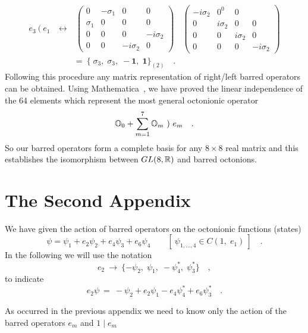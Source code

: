 \documentclass[a4paper,12pt]{book}
\begin{document}
\[
\begin{array}{llll}
{e_{3}~(~e_{1}}~ & \leftrightarrow & ~\left( 
\begin{array}{cccc}
0 & -\sigma _{1} & 0 & 0 \\ 
\sigma _{1} & 0 & 0 & 0 \\ 
0 & 0 & 0 & -i\sigma _{2} \\ 
0 & 0 & -i\sigma _{2} & 0
\end{array}
\right) & \left( 
\begin{array}{cccc}
-i\sigma _{2} & 0^{0} & 0 &  \\ 
0 & i\sigma _{2} & 0 & 0 \\ 
0 & 0 & i\sigma _{2} & 0 \\ 
0 & 0 & 0 & -i\sigma _{2}
\end{array}
\right) \\ 
&  & =~\{\;\sigma _{3},\;\sigma _{3},\;-\mathbf{1},\;\mathbf{1}\}_{(2)}\quad
. & 
\end{array}
\]
Following this procedure any matrix representation of right/left barred
operators can be obtained. Using Mathematica~\cite{math}, we have proved the
linear independence of the 64 elements which represent the most general
octonionic operator 
\[
\Bbb{O}_{0}+\sum_{m=1}^{7}\Bbb{O}_{m}~)~e_{m}\quad . 
\]
So our barred operators form a complete basis for any $8\times 8$ real
matrix and this establishes the isomorphism between $GL(8,\Bbb{R})$ and
barred octonions.

\newpage

\chapter{The Second Appendix}


We have given the action of barred operators on the octonionic functions
(states) 
\[
\psi =\psi _{1}+e_{2}\psi _{2}+e_{4}\psi _{3}+e_{6}\psi _{4}\quad \quad
[~\psi _{1,...,4}\in C(1,\;e_{1})~]\quad . 
\]
In the following we will use the notation 
\[
e_{2}~\rightarrow ~\{-\psi _{2},\;\psi _{1},\;-\psi _{4}^{*},\;\psi
_{3}^{*}\}\quad , 
\]
to indicate 
\[
e_{2}\psi ~=~-\psi _{2}+e_{2}\psi _{1}-e_{4}\psi _{4}^{*}+e_{6}\psi
_{3}^{*}\quad . 
\]

As occurred in the previous appendix we need to know only the action of the
barred operators ${e_{m}}$ and ${1\mid e_{m}}$
\end{document}
